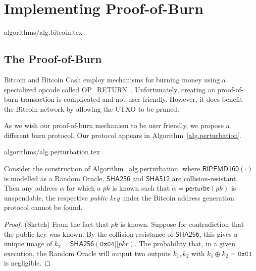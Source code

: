\section{Implementing Proof-of-Burn}

{algorithms/alg.bitcoin.tex}


\subsection{The Proof-of-Burn}
Bitcoin and Bitcoin Cash employ mechanisms for burning money using a specialized
opcode called \textsf{OP\_RETURN}~\cite{bartoletti2017analysis}. Unfortunately,
creating an  proof-of-burn transaction is complicated and not
user-friendly. However, it does benefit the Bitcoin network by allowing the UTXO
to be pruned.

As we wish our proof-of-burn mechanism to be user friendly, we propose a
different burn protocol. Our protocol appears in
Algorithm~\ref{alg.perturbation}.

{algorithms/alg.perturbation.tex}

\begin{lemma}[Unspendability]
  Consider the construction of Algorithm~\ref{alg.perturbation} where
  $\textsf{RIPEMD160}(\cdot)$ is modelled as a Random Oracle, $\textsf{SHA256}$
  and $\textsf{SHA512}$  are collision-resistant. Then any address $\alpha$ for
  which a $pk$ is known such that $\alpha = \textsf{perturbe}(pk)$ is
  unspendable, the respective \emph{public key} under the Bitcoin address
  generation protocol cannot be found.
\end{lemma}
\begin{proof}(Sketch)
  From the fact that $pk$ is known.
  Suppose for contradiction that the public key was known.
  By the collision-resistance of $\textsf{SHA256}$, this gives a unique image of
  $k_2 = \textsf{SHA256}(\texttt{0x04} || pkr)$.
  The probability that, in a given execution, the Random Oracle will output two
  outputs $k_1, k_2$ with $k_1 \oplus k_2 = \texttt{0x01}$ is negligible.
\end{proof}

